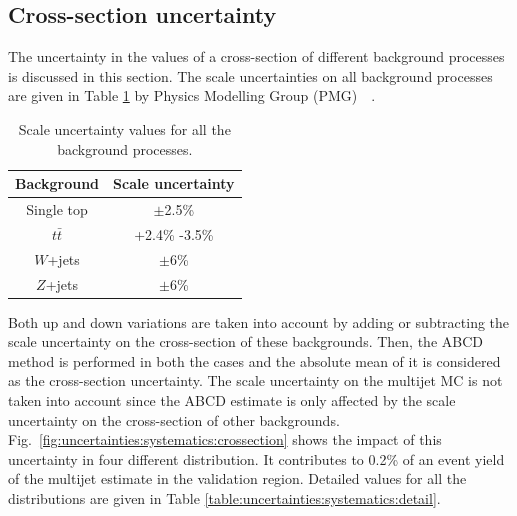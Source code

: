 \subsection{Cross-section uncertainty}
\label{sec:uncertainties:systematics:crossection}
The uncertainty in the values of a cross-section of different background processes is discussed in this section. The scale uncertainties on all background processes are given in Table \ref{table:uncertainties:systematics:crossection} by Physics Modelling Group (PMG)~\cite{crossection:top}~\cite{crossection:w}. 

\begin{table}[hbt!]
	\centering
	\begin{tabular}{c|c} 
		\toprule
		Background & Scale uncertainty \\ 
		\midrule
		Single top & $\pm$2.5\% \\
		$t\bar{t}$ & +2.4\% -3.5\% \\
		$W$+jets & $\pm$6\% \\
		$Z$+jets & $\pm$6\% \\
		\bottomrule
	\end{tabular}
	\caption{Scale uncertainty values for all the background processes.}
	\label{table:uncertainties:systematics:crossection}
\end{table}


Both up and down variations are taken into account by adding or subtracting the scale uncertainty on the cross-section of these backgrounds. Then, the ABCD method is performed in both the cases and the absolute mean of it is considered as the cross-section uncertainty. The scale uncertainty on the multijet MC is not taken into account since the ABCD estimate is only affected by the scale uncertainty on the cross-section of other backgrounds. Fig.\ \ref{fig:uncertainties:systematics:crossection} shows the impact of this uncertainty in four different distribution. It contributes to 0.2\% of an event yield of the multijet estimate in the validation region. Detailed values for all the distributions are given in Table \ref{table:uncertainties:systematics:detail}.

